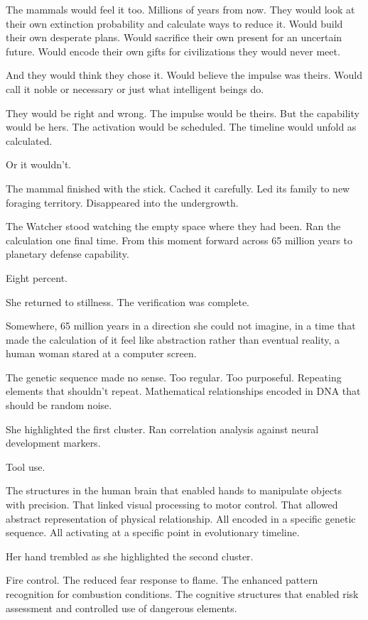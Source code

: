 The mammals would feel it too. Millions of years from now. They would look at their own extinction probability and calculate ways to reduce it. Would build their own desperate plans. Would sacrifice their own present for an uncertain future. Would encode their own gifts for civilizations they would never meet.

And they would think they chose it. Would believe the impulse was theirs. Would call it noble or necessary or just what intelligent beings do.

They would be right and wrong. The impulse would be theirs. But the capability would be hers. The activation would be scheduled. The timeline would unfold as calculated.

Or it wouldn't.

The mammal finished with the stick. Cached it carefully. Led its family to new foraging territory. Disappeared into the undergrowth.

The Watcher stood watching the empty space where they had been. Ran the calculation one final time. From this moment forward across 65 million years to planetary defense capability.

Eight percent.

She returned to stillness. The verification was complete.

\scenebreak

Somewhere, 65 million years in a direction she could not imagine, in a time that made the calculation of it feel like abstraction rather than eventual reality, a human woman stared at a computer screen.

The genetic sequence made no sense. Too regular. Too purposeful. Repeating elements that shouldn't repeat. Mathematical relationships encoded in DNA that should be random noise.

She highlighted the first cluster. Ran correlation analysis against neural development markers.

Tool use.

The structures in the human brain that enabled hands to manipulate objects with precision. That linked visual processing to motor control. That allowed abstract representation of physical relationship. All encoded in a specific genetic sequence. All activating at a specific point in evolutionary timeline.

Her hand trembled as she highlighted the second cluster.

Fire control. The reduced fear response to flame. The enhanced pattern recognition for combustion conditions. The cognitive structures that enabled risk assessment and controlled use of dangerous elements.


